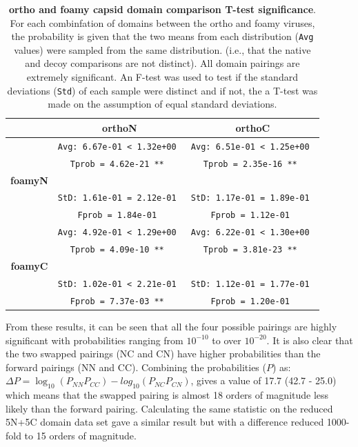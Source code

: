 \documentclass[preprint,12pt]{elsarticle}
\begin{document}
\begin{table}
\centering
\begin{tabular}{c|c|c|}
             &          {\bf orthoN}           &          {\bf orthoC}           \\
\hline \hline
             & {\tt Avg: 6.67e-01 < 1.32e+00 } & {\tt Avg: 6.51e-01 < 1.25e+00 } \\
             & {\tt Tprob = 4.62e-21 **      } & {\tt Tprob = 2.35e-16 **      } \\
{\bf foamyN} &                                 &                                 \\
             & {\tt StD: 1.61e-01 = 2.12e-01 } & {\tt StD: 1.17e-01 = 1.89e-01 } \\
             & {\tt Fprob = 1.84e-01         } & {\tt Fprob = 1.12e-01         } \\
\hline
             & {\tt Avg: 4.92e-01 < 1.29e+00 } & {\tt Avg: 6.22e-01 < 1.30e+00 } \\
             & {\tt Tprob = 4.09e-10 **      } & {\tt Tprob = 3.81e-23 **      } \\
{\bf foamyC} &                                 &                                 \\
             & {\tt StD: 1.02e-01 < 2.21e-01 } & {\tt StD: 1.12e-01 = 1.77e-01 } \\
             & {\tt Fprob = 7.37e-03 **      } & {\tt Fprob = 1.20e-01         } \\
\hline \hline
\end{tabular}
\begin{footnotesize}
\caption{
\label{Tab:Ttest}
{\bf ortho and foamy capsid domain comparison T-test significance}.
For each combinfation of domains between the ortho and foamy viruses, the probability
is given that the two means from each distribution ({\tt Avg} values) were sampled
from the same distribution.  (i.e., that the native and decoy comparisons are
not distinct).   All domain pairings are extremely significant.   An F-test was used to
test if the standard deviations ({\tt Std}) of each sample were distinct and if not,
the a T-test was made on the assumption of equal standard deviations.
}
\end{footnotesize}
\end{table}

From these results, it can be seen that all the four possible pairings are
highly significant with probabilities ranging from $10^{-10}$ to over $10^{-20}$.
It is also clear that the two swapped pairings (NC and CN) have higher probabilities
than the forward pairings (NN and CC).   Combining the probabilities ($P$) as:
$\Delta P = \log_{10}(P_{NN} P_{CC}) - log_{10}(P_{NC} P_{CN})$,
gives a value of 17.7 (42.7 - 25.0) which means that the swapped pairing is almost 18
orders of magnitude less likely than the forward pairing.
Calculating the same statistic on the reduced 5N+5C domain data set gave a similar result
but with a difference reduced 1000-fold to 15 orders of magnitude.
\end{document}
